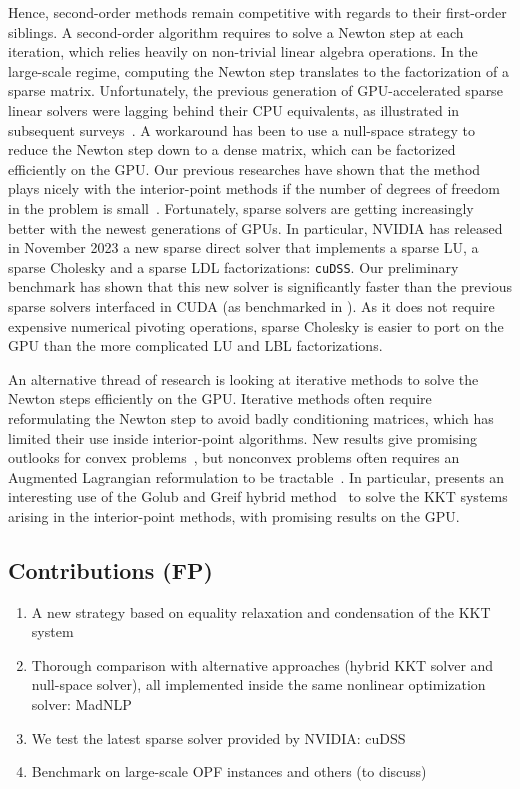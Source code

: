 Hence, second-order methods remain competitive with regards to their first-order
siblings. A second-order algorithm requires to solve a Newton step at each
iteration, which relies heavily on non-trivial linear algebra operations.
In the large-scale regime, computing the Newton step translates to the
factorization of a sparse matrix.
Unfortunately, the previous generation of GPU-accelerated sparse linear
solvers were lagging behind their CPU equivalents, as illustrated in
subsequent surveys~\cite{tasseff2019exploring,swirydowicz2021linear}.
A workaround has been to use a null-space strategy to reduce the Newton
step down to a dense matrix, which can be factorized efficiently on the GPU.
Our previous researches have shown that the method plays nicely with the interior-point
methods if the number of degrees of freedom in the problem is small~\cite{pacaud2022condensed}.
Fortunately, sparse solvers are getting increasingly better with the newest
generations of GPUs. In particular, NVIDIA has released in November 2023
a new sparse direct solver that implements a sparse LU, a sparse Cholesky
and a sparse LDL factorizations: {\tt cuDSS}. Our
preliminary benchmark has shown that this new solver is significantly
faster than the previous sparse solvers interfaced in CUDA (as benchmarked in \cite{swirydowicz2021linear}).
As it does not require expensive numerical pivoting operations, sparse Cholesky
is easier to port on the GPU than the more complicated LU and LBL factorizations.

An alternative thread of research is looking at iterative methods to solve the Newton steps efficiently on the GPU.
Iterative methods often require reformulating the Newton step to avoid
badly conditioning matrices, which has limited their use inside interior-point
algorithms. New results give promising outlooks for convex problems~\cite{ghannad2022linear},
but nonconvex problems often requires an Augmented Lagrangian reformulation
to be tractable~\cite{cao2016augmented,regev2023hykkt}. In particular,
\cite{regev2023hykkt} presents an interesting use of the Golub and Greif
hybrid method~\cite{golub2003solving} to solve the KKT systems arising in
the interior-point methods, with promising results on the GPU.


\subsection{Contributions (FP)}
\begin{enumerate}
  \item A new strategy based on equality relaxation
    and condensation of the KKT system
  \item Thorough comparison with alternative approaches
    (hybrid KKT solver and null-space solver), all implemented
    inside the same nonlinear optimization solver: MadNLP
  \item We test the latest sparse solver provided
    by NVIDIA: cuDSS
  \item Benchmark on large-scale OPF instances
    and others (to discuss)
\end{enumerate}
